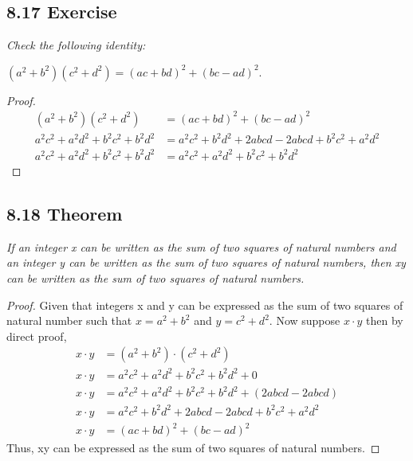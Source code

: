 \documentclass{article}
\begin{document}
\subsection*{8.17 Exercise} 
\quad \textit{Check the following identity:}
\begin{center}
    $(a^2 + b^2)(c^2 + d^2) = (ac + bd)^2 + (bc - ad)^2$.
\end{center}

\begin{proof}
\begin{align*}
    &&(a^2 + b^2)(c^2 + d^2) &= (ac + bd)^2 + (bc - ad)^2 &&\\
    &&a^2c^2 + a^2d^2 + b^2c^2 + b^2d^2 &= a^2c^2 + b^2d^2 + 2abcd - 2abcd + b^2c^2 + a^2d^2 &&\\
    &&a^2c^2 + a^2d^2 + b^2c^2 + b^2d^2 &= a^2c^2 + a^2d^2 + b^2c^2 + b^2d^2 &&
\end{align*}
\end{proof}

\subsection*{8.18 Theorem} 
\quad \textit{If an integer x can be written as the sum of two squares of natural numbers and an integer y can be written as the sum of two squares of natural numbers, then xy can be written as the sum of two squares of natural numbers.}

\begin{proof}
Given that integers x and y can be expressed as the sum of two squares of natural number such that $x = a^2 + b^2$ and $y = c^2 + d^2$. Now suppose $x \cdot y$ then by direct proof,
\begin{align*}
    &&x \cdot y &= (a^2 + b^2) \cdot (c^2 + d^2) &&\\
    &&x \cdot y &= a^2c^2 + a^2d^2 + b^2c^2 + b^2d^2 + 0 &&\\
    &&x \cdot y &= a^2c^2 + a^2d^2 + b^2c^2 + b^2d^2 + (2abcd - 2abcd) &&\\
    &&x \cdot y &= a^2c^2 + b^2d^2 + 2abcd - 2abcd + b^2c^2 + a^2d^2 &&\\
    &&x \cdot y &= (ac + bd)^2 + (bc - ad)^2 &&
\end{align*}
Thus, xy can be expressed as the sum of two squares of natural numbers.
\end{proof}
\end{document}
